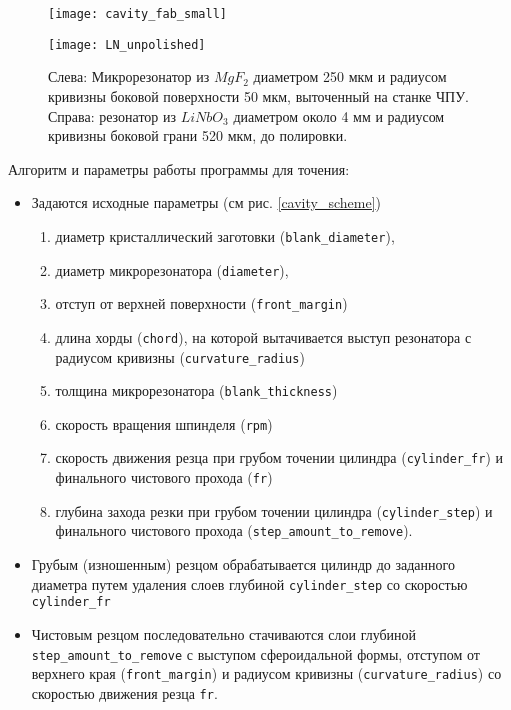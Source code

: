 \begin{figure}[ht]
  \begin{minipage}[ht]{0.49\linewidth}\centering
    \texttt{[image: cavity\_fab\_small]}
  \end{minipage}
  \hfill
  \begin{minipage}[ht]{0.25\linewidth}\centering
    \texttt{[image: LN\_unpolished]}
  \end{minipage}
  \caption{Слева: Микрорезонатор из $MgF_2$ диаметром 250 мкм и радиусом кривизны боковой поверхности 50 мкм, выточенный на станке ЧПУ. Справа: резонатор из $LiNbO_3$ диаметром около 4 мм и радиусом кривизны боковой грани 520 мкм, до полировки.}
  \label{cavity_small}
\end{figure}



Алгоритм и параметры работы программы для точения:
\begin{itemize}
  \item Задаются исходные параметры (см рис. \ref{cavity_scheme})
  \begin{enumerate}
    \item диаметр кристаллический заготовки (\texttt{blank\_diameter}),
    \item диаметр микрорезонатора (\texttt{diameter}),
    \item отступ от верхней поверхности (\texttt{front\_margin})
    \item длина хорды (\texttt{chord}), на которой вытачивается выступ резонатора с радиусом кривизны (\texttt{curvature\_radius})
    \item толщина микрорезонатора (\texttt{blank\_thickness})
    \item скорость вращения шпинделя (\texttt{rpm})
    \item скорость движения резца при грубом точении цилиндра (\texttt{cylinder\_fr}) и финального чистового прохода (\texttt{fr})
    \item глубина захода резки при грубом точении цилиндра (\texttt{cylinder\_step}) и финального чистового прохода (\texttt{step\_amount\_to\_remove}).
  \end{enumerate}
  \item Грубым (изношенным) резцом обрабатывается цилиндр до заданного диаметра путем удаления слоев глубиной \texttt{cylinder\_step} со скоростью \texttt{cylinder\_fr}
  \item Чистовым резцом последовательно стачиваются слои глубиной \texttt{step\_amount\_to\_remove} с выступом сфероидальной формы, отступом от верхнего края (\texttt{front\_margin}) и радиусом кривизны (\texttt{curvature\_radius}) со скоростью движения резца \texttt{fr}.
\end{itemize}

